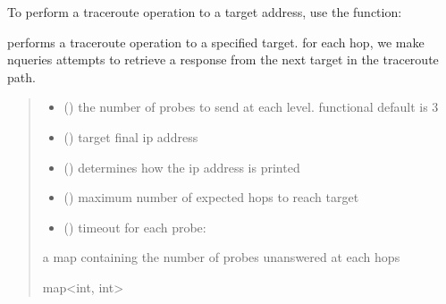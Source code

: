 \documentclass[letterpaper,10pt,english,openany,oneside]{sphinxmanual}
\begin{document}
\sphinxAtStartPar
To perform a traceroute operation to a target address, use
the  function:

\begin{fulllineitems}
\label{\detokenize{index:my_traceroute.traceroute}}
\pysigstartsignatures
\pysiglinewithargsret
{}
{\sphinxparamcomma {}\sphinxparamcomma {}\sphinxparamcomma {}\sphinxparamcomma {}}
{}
\pysigstopsignatures
\sphinxAtStartPar
performs a traceroute operation to a specified target. for each hop, we make nqueries attempts to
retrieve a response from the next target in the traceroute path.
\begin{quote}\begin{description}
\begin{itemize}
\item {} 
\sphinxAtStartPar
{} () \textendash{} the number of probes to send at each level. functional default is 3

\item {} 
\sphinxAtStartPar
{} () \textendash{} target final ip address

\item {} 
\sphinxAtStartPar
{} () \textendash{} determines how the ip address is printed

\item {} 
\sphinxAtStartPar
{} () \textendash{} maximum number of expected hops to reach target

\item {} 
\sphinxAtStartPar
{} () \textendash{} timeout for each probe:

\end{itemize}

\sphinxAtStartPar
a map containing the number of probes unanswered at each hops

\sphinxAtStartPar
map\textless{}int, int\textgreater{}

\end{description}\end{quote}

\end{fulllineitems}
\end{document}
